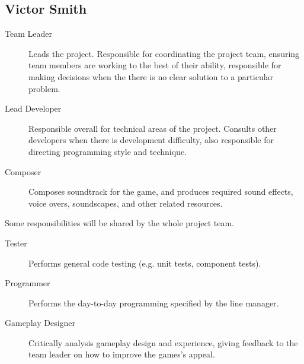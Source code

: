 \subsection{Victor Smith}
\begin{description}

    \item[Team Leader] Leads the project. Responsible for coordinating the project team, ensuring team members are working to the best of their ability, responsible for making decisions when the there is no clear solution to a particular problem.
      
    \item[Lead Developer] Responsible overall for technical areas of the project. Consults other developers when there is development difficulty, also responsible for directing programming style and technique.
    
    \item[Composer] Composes soundtrack for the game, and produces required sound effects, voice overs, soundscapes, and other related resources.
    
\end{description}

Some responsibilities will be shared by the whole project team.
\begin{description}
    \item[Tester] Performs general code testing (e.g. unit tests, component tests).
    
    \item[Programmer] Performs the day-to-day programming specified by the line manager.
    
    \item[Gameplay Designer] Critically analysis gameplay design and experience, giving feedback to the team leader on how to improve the games's appeal.
\end{description}
